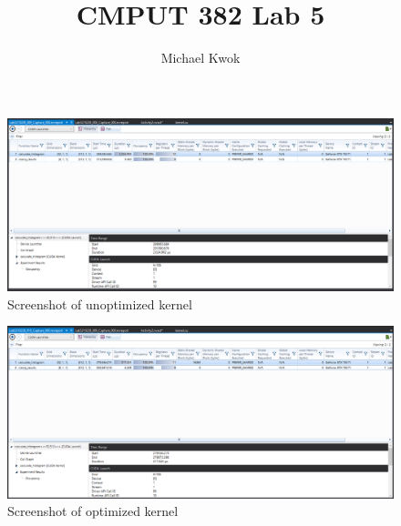 \documentclass{article}
\title{CMPUT 382 Lab 5}
\author{Michael Kwok}
\begin{document}
\begin{figure}
    \centering
    \includegraphics[width=\textwidth]{Unopt.png}
    \caption{Screenshot of unoptimized kernel}

\end{figure}

\begin{figure}
    \centering
    \includegraphics[width=\textwidth]{Opt.png}
    \caption{Screenshot of optimized kernel}
\end{figure}
\end{document}
